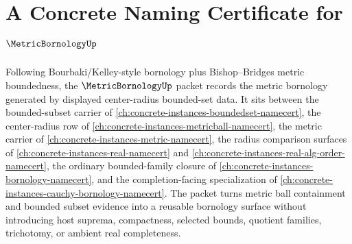 \chapter{A Concrete Naming Certificate for $\MetricBornologyUp$}
\label{ch:concrete-instances-metric-bornology-namecert}

Following Bourbaki/Kelley-style bornology plus Bishop--Bridges metric boundedness, the $\MetricBornologyUp$ packet records the metric bornology generated by displayed center-radius bounded-set data. It sits between the bounded-subset carrier of \autoref{ch:concrete-instances-boundedset-namecert}, the center-radius row of \autoref{ch:concrete-instances-metricball-namecert}, the metric carrier of \autoref{ch:concrete-instances-metric-namecert}, the radius comparison surfaces of \autoref{ch:concrete-instances-real-namecert} and \autoref{ch:concrete-instances-real-alg-order-namecert}, the ordinary bounded-family closure of \autoref{ch:concrete-instances-bornology-namecert}, and the completion-facing specialization of \autoref{ch:concrete-instances-cauchy-bornology-namecert}. The packet turns metric ball containment and bounded subset evidence into a reusable bornology surface without introducing host suprema, compactness, selected bounds, quotient families, trichotomy, or ambient real completeness.

